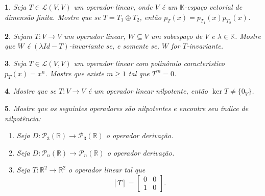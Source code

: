 \documentclass[12pt]{exam}
\newtheorem{exercicio}{}
\newcommand{\sub}{\subseteq}
\newcommand{\real}{\mathbb{R}}
\newcommand{\cp}[1]{\mathbb{#1}}
\begin{document}
\begin{exercicio}
Seja $T \in \mathcal{L}(V,V)$ um operador linear, onde $V$ é um $\cp{K}$-espaço vetorial de dimensão finita. Mostre que se $T = T_1 \oplus T_2$, ent\~ao $p_T(x) = p_{T_1}(x)p_{T_2}(x)$.
\end{exercicio}

\begin{exercicio}
  Sejam $T : V \to V$ um operador linear, $W \sub V$ um subespa\c{c}o de $V$ e $\lambda \in \cp{K}$. Mostre que $W$ \'e $(\lambda Id - T)$-invariante se, e somente se, $W$ for $T$-invariante.
\end{exercicio}

\begin{exercicio}
  Seja $T \in \mathcal{L}(V,V)$ um operador linear com polin\^omio caracter{\'\i}stico $p_T(x) = x^n$. Mostre que existe $m \ge 1$ tal que $T^m = 0$.
\end{exercicio}


\begin{exercicio}
  Mostre que se $T : V \to V$ \'e um operador linear nilpotente, ent\~ao $\ker T \ne \{0_V\}$.
\end{exercicio}

\begin{exercicio}
  Mostre que os seguintes operadores s\~ao nilpotentes e encontre seu \'indice de nilpot\^encia:
  \begin{enumerate}[label=({\alph*})]
    \item Seja $D : \mathcal{P}_3(\real) \to \mathcal{P}_3(\real)$ o operador deriva\c{c}\~ao.
    \item Seja $D : \mathcal{P}_n(\real) \to \mathcal{P}_n(\real)$ o operador deriva\c{c}\~ao.
    \item Seja $T : \real^2 \to \real^2$ o operador linear tal que
    \[
      [T] = \begin{bmatrix}
        0 & 0\\
        1 & 0
      \end{bmatrix}.
    \]
  \end{enumerate}
\end{exercicio}
\end{document}
